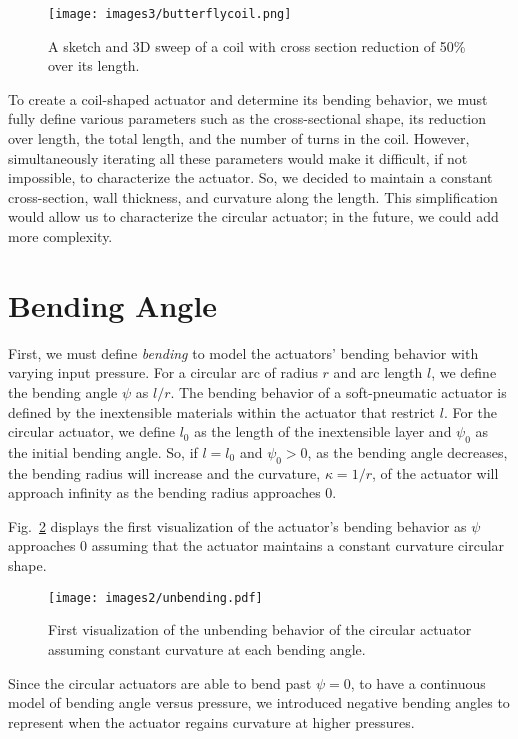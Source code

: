 \begin{figure}[ht]
    \centering
    \texttt{[image: images3/butterflycoil.png]}
    \caption{A sketch and 3D sweep of a coil with cross section reduction of 50\% over its length.}
    \label{fig:butterflycoil}
\end{figure}

To create a coil-shaped actuator and determine its bending behavior, we must fully define various parameters such as the cross-sectional shape, its reduction over length, the total length, and the number of turns in the coil. However, simultaneously iterating all these parameters would make it difficult, if not impossible, to characterize the actuator. So, we decided to maintain a constant cross-section, wall thickness, and curvature along the length. This simplification would allow us to characterize the circular actuator; in the future, we could add more complexity. 

\section{Bending Angle}

First, we must define \emph{bending} to model the actuators' bending behavior with varying input pressure. For a circular arc of radius $r$ and arc length $l$, we define the bending angle $\psi$ as $l/r$. The bending behavior of a soft-pneumatic actuator is defined by the inextensible materials within the actuator that restrict $l$. For the circular actuator, we define $l_{0}$ as the length of the inextensible layer and $\psi_0$ as the initial bending angle. So, if $l=l_0$ and $\psi_0>0$, as the bending angle decreases, the bending radius will increase and the curvature, $\kappa=1/r$, of the actuator will approach infinity as the bending radius approaches 0. 

Fig.~\ref{fig:unbending} displays the first visualization of the actuator's bending behavior as $\psi$ approaches $0$ assuming that the actuator maintains a constant curvature circular shape. 
\\
\begin{figure}[ht]
    \centering
    \texttt{[image: images2/unbending.pdf]}
    \caption{First visualization of the unbending behavior of the circular actuator assuming constant curvature at each bending angle.}
    \label{fig:unbending}
\end{figure}

Since the circular actuators are able to bend past $\psi=0$, to have a continuous model of bending angle versus pressure, we introduced negative bending angles to represent when the actuator regains curvature at higher pressures. 

